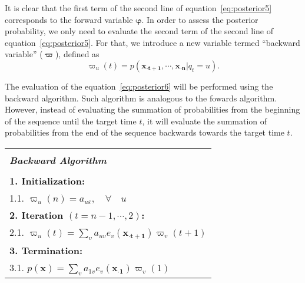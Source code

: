 It is clear that the first term of the second line of equation~\ref{eq:posterior5} corresponds to the forward variable $ \boldsymbol\varphi $. In order to assess the posterior probability, we only need to evaluate the second term of the second line of equation~\ref{eq:posterior5}. For that, we introduce a new variable termed ``backward variable'' ($ \boldsymbol\varpi $), defined as
\begin{equation}
  \label{eq:posterior6}
  \varpi_u(t) = p(\mathbf{{x}_{\cdot t+1}}, \cdots, \mathbf{{x}_{\cdot n}} | q_t = u).
\end{equation}

The evaluation of the equation~\ref{eq:posterior6} will be performed using the backward algorithm. Such algorithm is analogous to the fowards algorithm. However, instead of evaluating the summation of probabilities from the beginning of the sequence until the target time $ t $, it will evaluate the summation of probabilities from the end of the sequence backwards towards the target time $ t $.

\begin{center}
  \begin{spacing}{1.0}
    \begin{tabular}{l}
      \hline \\[-0.25cm]
      \hspace{1.3cm} {\large {\bf \emph{ Backward Algorithm } } } \hspace{1.3cm} \\[0.1cm]
      \hline \\[-0.25cm]
      \hspace{0.2cm} {\bf 1. Initialization:} \\
      \hspace{0.9cm} 1.1. $ \varpi_u(n) = a_{u\varepsilon}, \quad \forall \quad u $ \\
      \hspace{0.2cm} {\bf 2. Iteration $ (t = n-1, \cdots, 2) $:} \\
      \hspace{0.9cm} 2.1. $ \varpi_u(t) = \sum_{v}{a_{uv} e_v(\mathbf{{x}_{\cdot t+1}}) \varpi_v(t+1)} $ \\
      \hspace{0.2cm} {\bf 3. Termination:} \\
      \hspace{0.9cm} 3.1. $ p(\mathbf{x}) = \sum_{v}{a_{1v} e_v(\mathbf{{x}_{\cdot 1}}) \varpi_v(1)} $ \\[0.1cm]
      \hline
    \end{tabular}
  \end{spacing}
\end{center}

